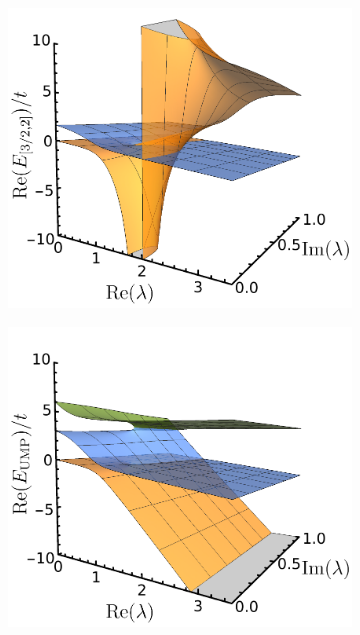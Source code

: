 \documentclass[aps,prb,reprint,noshowkeys,superscriptaddress]{revtex4-1}
\begin{document}
\begin{figure}
    \begin{subfigure}{0.32\textwidth}
	\includegraphics[height=0.85\textwidth]{fig11a}	
    \end{subfigure}
    \begin{subfigure}{0.32\textwidth}
	\includegraphics[height=0.85\textwidth]{fig11b}
    \end{subfigure}

\end{figure}
\end{document}
